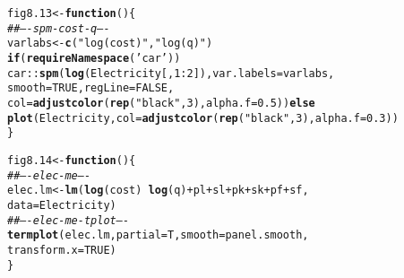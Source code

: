 \documentclass[12pt, a4paper,  BCOR=8.25mm, DIV=15]{scrartcl}\usepackage[]{graphicx}\usepackage[]{color}
\makeatletter
\newcommand{\hlnum}[1]{\textcolor[rgb]{0.686,0.059,0.569}{#1}}%
\newcommand{\hlstr}[1]{\textcolor[rgb]{0.192,0.494,0.8}{#1}}%
\newcommand{\hlcom}[1]{\textcolor[rgb]{0.678,0.584,0.686}{\textit{#1}}}%
\newcommand{\hlopt}[1]{\textcolor[rgb]{0,0,0}{#1}}%
\newcommand{\hlstd}[1]{\textcolor[rgb]{0.345,0.345,0.345}{#1}}%
\newcommand{\hlkwa}[1]{\textcolor[rgb]{0.161,0.373,0.58}{\textbf{#1}}}%
\newcommand{\hlkwb}[1]{\textcolor[rgb]{0.69,0.353,0.396}{#1}}%
\newcommand{\hlkwc}[1]{\textcolor[rgb]{0.333,0.667,0.333}{#1}}%
\newcommand{\hlkwd}[1]{\textcolor[rgb]{0.737,0.353,0.396}{\textbf{#1}}}%
\newenvironment{kframe}{%
 \def\at@end@of@kframe{}%
 \ifinner\ifhmode%
  \def\at@end@of@kframe{\end{minipage}}%
  \begin{minipage}{\columnwidth}%
 \fi\fi%
 \def\FrameCommand##1{\hskip\@totalleftmargin \hskip-\fboxsep
 \colorbox{shadecolor}{##1}\hskip-\fboxsep
     \hskip-\linewidth \hskip-\@totalleftmargin \hskip\columnwidth}%
 \MakeFramed {\advance\hsize-\width
   \@totalleftmargin\z@ \linewidth\hsize
   \@setminipage}}%
 {\par\unskip\endMakeFramed%
 \at@end@of@kframe}
\newenvironment{knitrout}{}{} %
\makeatother
\begin{document}
\begin{knitrout}
\color{fgcolor}\begin{kframe}
\begin{alltt}
\hlstd{fig8.13} \hlkwb{<-} \hlkwa{function}\hlstd{()\{}
\hlcom{## ---- spm-cost-q ----}
\hlstd{varlabs} \hlkwb{<-} \hlkwd{c}\hlstd{(}\hlstr{"log(cost)"}\hlstd{,} \hlstr{"log(q)"}\hlstd{)}
\hlkwa{if}\hlstd{(}\hlkwd{requireNamespace}\hlstd{(}\hlstr{'car'}\hlstd{))}
\hlstd{car}\hlopt{::}\hlkwd{spm}\hlstd{(}\hlkwd{log}\hlstd{(Electricity[,}\hlnum{1}\hlopt{:}\hlnum{2}\hlstd{]),} \hlkwc{var.labels}\hlstd{=varlabs,}
    \hlkwc{smooth}\hlstd{=}\hlnum{TRUE}\hlstd{,} \hlkwc{regLine}\hlstd{=}\hlnum{FALSE}\hlstd{,}
    \hlkwc{col}\hlstd{=}\hlkwd{adjustcolor}\hlstd{(}\hlkwd{rep}\hlstd{(}\hlstr{"black"}\hlstd{,}\hlnum{3}\hlstd{),} \hlkwc{alpha.f}\hlstd{=}\hlnum{0.5}\hlstd{))} \hlkwa{else}
    \hlkwd{plot}\hlstd{(Electricity,} \hlkwc{col}\hlstd{=}\hlkwd{adjustcolor}\hlstd{(}\hlkwd{rep}\hlstd{(}\hlstr{"black"}\hlstd{,}\hlnum{3}\hlstd{),} \hlkwc{alpha.f}\hlstd{=}\hlnum{0.3}\hlstd{))}
\hlstd{\}}
\end{alltt}
\end{kframe}
\end{knitrout}

\begin{knitrout}
\color{fgcolor}\begin{kframe}
\begin{alltt}
\hlstd{fig8.14} \hlkwb{<-} \hlkwa{function}\hlstd{()\{}
\hlcom{## ---- elec-me ----}
\hlstd{elec.lm} \hlkwb{<-} \hlkwd{lm}\hlstd{(}\hlkwd{log}\hlstd{(cost)} \hlopt{~} \hlkwd{log}\hlstd{(q)}\hlopt{+}\hlstd{pl}\hlopt{+}\hlstd{sl}\hlopt{+}\hlstd{pk}\hlopt{+}\hlstd{sk}\hlopt{+}\hlstd{pf}\hlopt{+}\hlstd{sf,}
              \hlkwc{data}\hlstd{=Electricity)}
\hlcom{## ---- elec-me-tplot ----}
\hlkwd{termplot}\hlstd{(elec.lm,} \hlkwc{partial}\hlstd{=T,} \hlkwc{smooth}\hlstd{=panel.smooth,}
         \hlkwc{transform.x}\hlstd{=}\hlnum{TRUE}\hlstd{)}
\hlstd{\}}
\end{alltt}
\end{kframe}
\end{knitrout}
\end{document}
